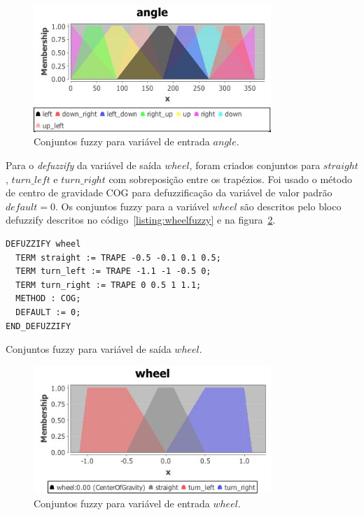 \documentclass[12pt, a4paper]{article}
\begin{document}
\begin{figure}[h!]
  \centering
  \includegraphics[width=0.8\textwidth]{assets/angle.jpg}
  \caption{Conjuntos fuzzy para variável de entrada $angle$.}\label{figure:anglefuzzy}
\end{figure}

Para o \textit{defuzzify} da variável de saída $wheel$, foram criados conjuntos para $straight$, $turn\_left$ e $turn\_right$ com sobreposição entre os trapézios.
Foi usado o método de centro de gravidade COG para defuzzificação da variável de valor padrão $default = 0$.
Os conjuntos fuzzy para a variável $wheel$ são descritos pelo bloco defuzzify descritos no código~\ref{listing:wheelfuzzy} e na figura~\ref{figure:wheelfuzzy}.

\begin{listing}[h!]
  \begin{verbatim}
DEFUZZIFY wheel
  TERM straight := TRAPE -0.5 -0.1 0.1 0.5;
  TERM turn_left := TRAPE -1.1 -1 -0.5 0;
  TERM turn_right := TRAPE 0 0.5 1 1.1;
  METHOD : COG;
  DEFAULT := 0;
END_DEFUZZIFY
  \end{verbatim}
  \caption{Conjuntos fuzzy para variável de saída $wheel$.}\label{listing:wheelfuzzy}
\end{listing}

\begin{figure}[h!]
  \centering
  \includegraphics[width=0.8\textwidth]{assets/wheel.jpg}
  \caption{Conjuntos fuzzy para variável de entrada $wheel$.}\label{figure:wheelfuzzy}
\end{figure}
\end{document}
